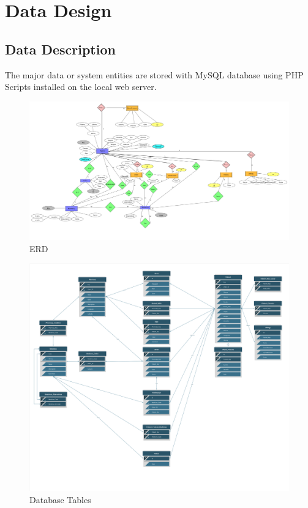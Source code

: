 \documentclass[]{article}
\begin{document}
\section{Data Design}
\subsection{Data Description}
The major data or system entities are stored with MySQL database using PHP Scripts installed on the local web server.

\begin{figure}[H]

\includegraphics[scale=0.18]{./database/Erd}
\caption{ERD}
\end{figure}

\begin{figure}[H]
\centering
\includegraphics[scale=0.09]{./database/DatabaseTables}
\caption{Database Tables}
\end{figure}
\end{document}
